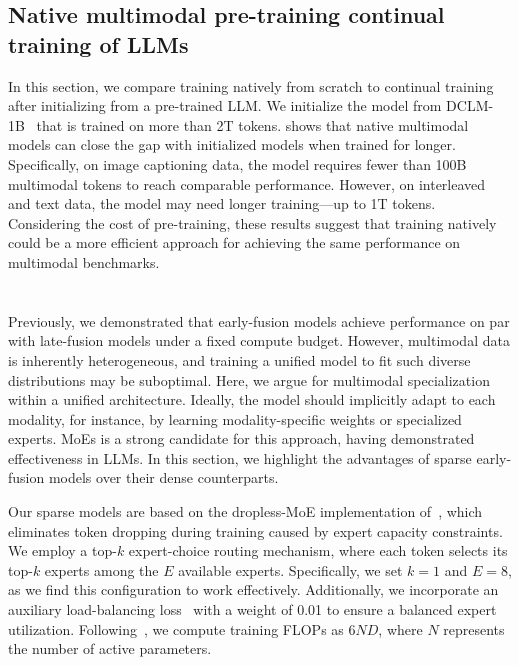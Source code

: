 \subsection{Native multimodal pre-training \textbf{\vs} continual training of
LLMs}
\label{sec:native_vs_continual}
In this section, we compare training natively from scratch to continual training
after initializing from a pre-trained LLM. We initialize the model from DCLM-1B~\citep{fang2023data} that is trained on more than 2T tokens.
 shows that native multimodal models can
close the gap with initialized models when trained for longer.
Specifically, on image captioning data, the model requires fewer than 100B
multimodal tokens to reach comparable performance. However, on interleaved and
text data, the model may need longer training—up to 1T tokens.
Considering the cost of pre-training, these results suggest that training
natively could be a more efficient approach for achieving the same performance on multimodal benchmarks.






\section{}
Previously, we demonstrated that early-fusion models achieve performance on par
with late-fusion models under a fixed compute budget. However, multimodal data
is inherently heterogeneous, and training a unified model to fit such diverse
distributions may be suboptimal.  
Here, we argue for multimodal specialization within a unified architecture.
Ideally, the model should implicitly adapt to each modality, for instance, by
learning modality-specific weights or specialized experts. MoEs is
a strong candidate for this approach, having demonstrated effectiveness in LLMs.  
In this section, we highlight the advantages of sparse early-fusion models over
their dense counterparts.



 Our sparse models are based on the dropless-MoE implementation
of~\citet{gale2023megablocks}, which eliminates token dropping during training
caused by expert capacity constraints. We employ a top-$k$ expert-choice routing
mechanism, where each token selects its top-$k$ experts among the $E$ available
experts. Specifically, we set $k=1$ and $E=8$, as we find this configuration to
work effectively.  
Additionally, we incorporate an auxiliary load-balancing
loss~\citep{shazeer2017outrageously} with a weight of 0.01 to ensure a balanced
expert utilization. Following~\citet{abnar2025parameters}, we compute training
FLOPs as $6ND$, where $N$ represents the number of active parameters.  



